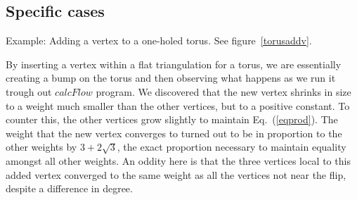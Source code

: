 \documentclass[12pt]{article}
\begin{document}
\subsection{Specific cases}

\noindent Example: Adding a vertex to a one-holed torus. See figure~\ref{torusaddv}. \newline

\noindent By inserting a vertex within a flat triangulation for a torus, we are essentially creating a bump on the torus and then observing what happens as we run it trough out $calcFlow$ program. We discovered that the new vertex shrinks in size to a weight much smaller than the other vertices, but to a positive constant. To counter this, the other vertices grow slightly to maintain Eq.~(\ref{eqprod}). The weight that the new vertex converges to turned out to be in proportion to the other weights by $3+2\sqrt{3}$, the exact proportion necessary to maintain equality amongst all other weights. An oddity here is that the three vertices local to this added vertex converged to the same weight as all the vertices not near the flip, despite a difference in degree.\newline
\end{document}
